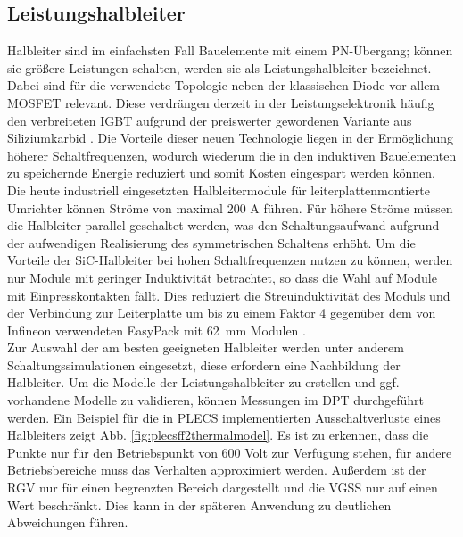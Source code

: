 		\subsection{Leistungshalbleiter}
		Halbleiter sind im einfachsten Fall Bauelemente mit einem PN-Übergang; können sie größere Leistungen schalten, werden sie als Leistungshalbleiter bezeichnet. Dabei sind für die verwendete Topologie neben der klassischen Diode vor allem \gls{MOSFET} relevant. Diese verdrängen derzeit in der Leistungselektronik häufig den verbreiteten \gls{IGBT} aufgrund der preiswerter gewordenen Variante aus Siliziumkarbid \cite{SiCTrend}. Die Vorteile dieser neuen Technologie liegen in der Ermöglichung höherer Schaltfrequenzen, wodurch wiederum die in den induktiven Bauelementen zu speichernde Energie reduziert und somit Kosten eingespart werden können.\\
		Die heute industriell eingesetzten Halbleitermodule für leiterplattenmontierte Umrichter können Ströme von maximal 200 A führen. Für höhere Ströme müssen die Halbleiter parallel geschaltet werden, was den Schaltungsaufwand aufgrund der aufwendigen Realisierung des symmetrischen Schaltens erhöht. Um die Vorteile der \gls{SiC}-Halbleiter bei hohen Schaltfrequenzen nutzen zu können, werden nur Module mit geringer Induktivität betrachtet, so dass die Wahl auf Module mit Einpresskontakten fällt. Dies reduziert die Streuinduktivität des Moduls und der Verbindung zur Leiterplatte um bis zu einem Faktor 4 gegenüber dem von Infineon verwendeten EasyPack mit 62~mm Modulen \cite{IFAGFF2} \cite{IFAGFF2-62mm}. \\
		Zur Auswahl der am besten geeigneten Halbleiter werden unter anderem Schaltungssimulationen eingesetzt, diese erfordern eine Nachbildung der Halbleiter. Um die Modelle der Leistungshalbleiter zu erstellen und ggf. vorhandene Modelle zu validieren, können Messungen im \gls{DPT} durchgeführt werden. Ein Beispiel für die in \gls{PLECS} implementierten Ausschaltverluste eines Halbleiters zeigt Abb. \ref{fig:plecsff2thermalmodel}. Es ist zu erkennen, dass die Punkte nur für den Betriebspunkt von 600 Volt zur Verfügung stehen, für andere Betriebsbereiche muss das Verhalten approximiert werden. Außerdem ist der \gls{RGV} nur für einen begrenzten Bereich dargestellt und die \gls{VGSS} nur auf einen Wert beschränkt. Dies kann in der späteren Anwendung zu deutlichen Abweichungen führen. 
